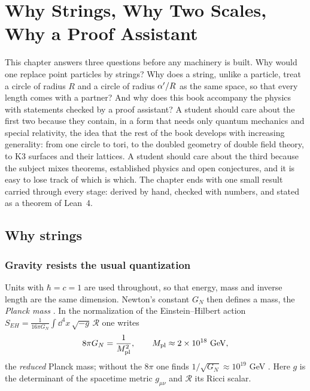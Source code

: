 \chapter{Why Strings, Why Two Scales, Why a Proof Assistant}\label{ch:intro}

This chapter answers three questions before any machinery is built. Why would one replace
point particles by strings? Why does a string, unlike a particle, treat a circle of radius $R$
and a circle of radius $\alpha'/R$ as the same space, so that every length comes with a partner?
And why does this book accompany the physics with statements checked by a proof assistant?
A student should care about the first two because they contain, in a form that needs only
quantum mechanics and special relativity, the idea that the rest of the book develops with
increasing generality: from one circle to tori, to the doubled geometry of double field
theory, to K3 surfaces and their lattices. A student should care about the third because
the subject mixes theorems, established physics and open conjectures, and it is easy to lose
track of which is which. The chapter ends with one small result carried through every
stage: derived by hand, checked with numbers, and stated as a theorem of Lean~4.

\section{Why strings}\label{sec:intro:whystrings}

\subsection{Gravity resists the usual quantization}

Units with $\hbar=c=1$ are used throughout, so that energy, mass and inverse length are the
same dimension. Newton's constant $G_N$ then defines a mass, the \emph{Planck mass}%
. In the normalization of the Einstein--Hilbert action
$S_{EH}=\frac{1}{16\pi G_N}\int \dd^4x\,\sqrt{-g}\,\mathcal{R}$ one writes
\begin{equation}\label{eq:intro:planck}
  8\pi G_N=\frac{1}{M_{\rm pl}^2},\qquad M_{\rm pl}\approx 2\times 10^{18}\ \text{GeV},
\end{equation}
the \emph{reduced} Planck mass; without the $8\pi$ one finds $1/\sqrt{G_N}\approx 10^{19}$ GeV
. Here $g$ is the determinant of the spacetime metric
$g_{\mu\nu}$ and $\mathcal{R}$ its Ricci scalar.

